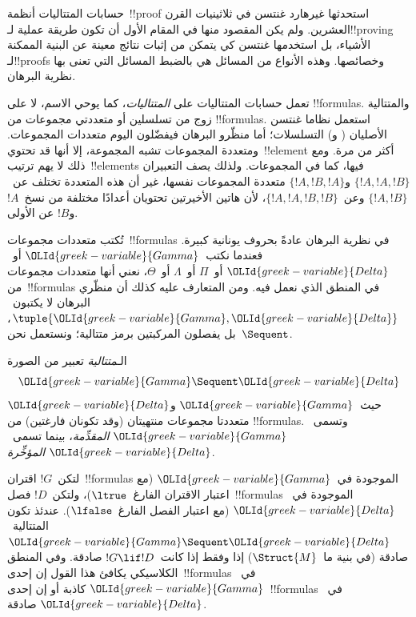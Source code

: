 \documentclass[../../../include/open-logic-section]{subfiles}
\begin{document}


حسابات المتتاليات أنظمة~!!{proof} استحدثها غيرهارد غنتسن في ثلاثينيات
القرن العشرين. ولم يكن المقصود منها في المقام الأول أن تكون طريقة عملية
لـ!!{proving} الأشياء، بل استخدمها غنتسن كي يتمكن من إثبات نتائج معينة
عن البنية الممكنة لـ!!{proof}s وخصائصها. وهذه الأنواع من المسائل هي بالضبط
المسائل التي تعنى بها نظرية البرهان.

تعمل حسابات المتتاليات على \emph{المتتاليات}، كما يوحي الاسم، لا على
!!{formula}s. والمتتالية زوج من تسلسلين أو متعددتي مجموعات من
!!{formula}s. استعمل نظاما غنتسن الأصليان ( و)
التسلسلات؛ أما منظّرو البرهان فيفضّلون اليوم متعددات المجموعات. ومتعددة
المجموعات تشبه المجموعة، إلا أنها قد تحتوي~!!{element} أكثر من مرة. ومع
ذلك لا يهم ترتيب~!!{element}s فيها، كما في المجموعات. ولذلك يصف التعبيران
$\{!A, !A, !B\}$ و$\{!A, !B, !A\}$ متعددة المجموعات نفسها، غير أن هذه
المتعددة تختلف عن~$\{!A,!B\}$ وعن~$\{!A,!A,!B,!B\}$، لأن هاتين الأخيرتين
تحتويان أعدادًا مختلفة من نسخ~$!A$ و$!B$ عن الأولى.

تُكتب متعددات مجموعات~!!{formula}s في نظرية البرهان عادةً بحروف يونانية
كبيرة. فعندما نكتب~$\OLId{greek-variable}{Gamma}$ أو~$\OLId{greek-variable}{Delta}$ أو~$\Pi$ أو~$\Lambda$ أو~$\Theta$،
نعني أنها متعددات مجموعات من~!!{formula}s في المنطق الذي نعمل فيه. ومن
المتعارف عليه كذلك أن منظّري البرهان لا يكتبون~$\tuple{\OLId{greek-variable}{Gamma},\OLId{greek-variable}{Delta}}$،
بل يفصلون المركبتين برمز متتالية؛ ونستعمل نحن~$\Sequent$.

\begin{defn}[متتالية]
الـ\emph{متتالية} تعبير من الصورة
\[
\OLId{greek-variable}{Gamma} \Sequent \OLId{greek-variable}{Delta}
\]
حيث~$\OLId{greek-variable}{Gamma}$ و$\OLId{greek-variable}{Delta}$ متعددتا مجموعات منتهيتان (وقد تكونان فارغتين) من
!!{formula}s. وتسمى~$\OLId{greek-variable}{Gamma}$ \emph{المقدِّمة}، بينما تسمى~$\OLId{greek-variable}{Delta}$
\emph{المؤخِّرة}.
\end{defn}

لتكن~$!G$ اقتران~!!{formula}s الموجودة في~$\OLId{greek-variable}{Gamma}$ (مع اعتبار الاقتران
الفارغ~$\ltrue$)، ولتكن~$!D$ فصل~!!{formula}s الموجودة في~$\OLId{greek-variable}{Delta}$ (مع
اعتبار الفصل الفارغ~$\lfalse$). عندئذ تكون المتتالية~$\OLId{greek-variable}{Gamma}\Sequent\OLId{greek-variable}{Delta}$
صادقة (في بنية ما~$\Struct{M}$) إذا وفقط إذا كانت~$!G\lif !D$ صادقة. وفي
المنطق الكلاسيكي يكافئ هذا القول إن إحدى~!!{formula}s في~$\OLId{greek-variable}{Gamma}$ كاذبة
أو إن إحدى~!!{formula}s في~$\OLId{greek-variable}{Delta}$ صادقة.
\end{document}
